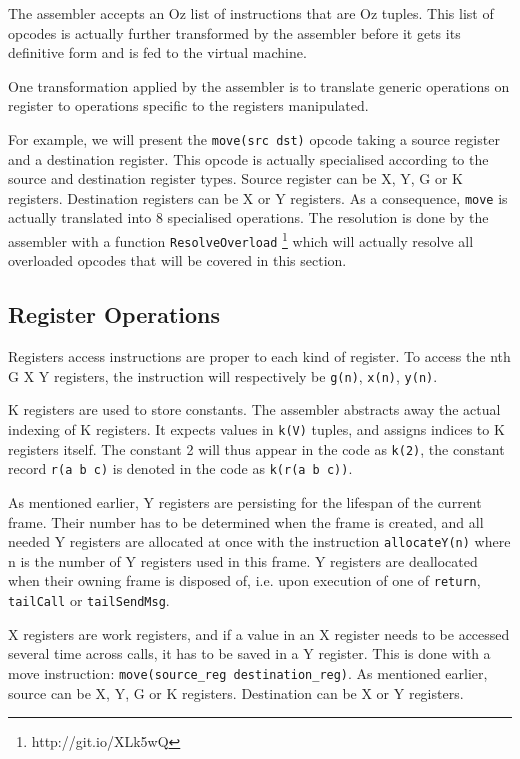 \documentclass[a4paper]{memoir}
\begin{document}
The assembler accepts an Oz list of instructions that are Oz tuples. This list
of opcodes is actually further transformed by
the assembler before it gets its definitive form and is fed to the virtual
machine.                                             

One transformation applied by the assembler is to translate generic operations
on register to operations specific to the registers manipulated. 

For example, we will present the \lstinline!move(src dst)! opcode taking a
source register and a destination register. This opcode is actually
specialised according to the source and destination register types. Source
register can be X, Y, G or K registers. Destination registers can be 
X or Y registers. As a consequence, \lstinline!move! is actually translated into
8 specialised operations. The resolution is done by the
assembler with a function
\lstinline!ResolveOverload! \cite{Moz2src}\footnote{http://git.io/XLk5wQ} 
which will actually resolve all overloaded opcodes that will be covered in this section. 

\subsection{Register Operations}\label{sec:intro:opcode:registers}
Registers access instructions are proper to each kind of register. To access the nth G X Y
registers, the instruction will respectively be \lstinline!g(n)!,
\lstinline!x(n)!, \lstinline!y(n)!. 

K registers are used to store constants. The assembler abstracts away the actual indexing of K registers. It expects values in \lstinline!k(V)! tuples, and assigns indices to K registers itself. The constant 2 will thus appear in the code as
\lstinline!k(2)!, the constant record \lstinline!r(a b c)! is denoted in the
code as \lstinline!k(r(a b c))!.


As mentioned earlier, Y registers are persisting for the lifespan of the current frame. Their number has to be determined when the frame is created, and all needed Y registers are allocated at once with the instruction \lstinline!allocateY(n)! where n is the number of Y registers used in this frame.
Y registers are deallocated when their owning frame is disposed of, i.e. upon execution of one of \lstinline!return!, \lstinline!tailCall! or \lstinline!tailSendMsg!.

X registers are work registers, and if a value in an X register needs to be accessed several time across calls, it has to be saved in a Y register. This is done with a move instruction: \lstinline!move(source_reg destination_reg)!.
As mentioned earlier, source
can be  X, Y, G or K registers. Destination can be X or Y registers.
\end{document}

